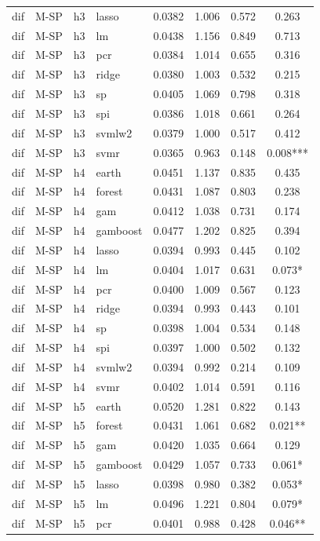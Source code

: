 \begin{ThreePartTable}
\begin{longtable}[t]{llclcccc}
dif & M-SP & h3 & lasso & 0.0382 & 1.006 & 0.572 & 0.263\\
dif & M-SP & h3 & lm & 0.0438 & 1.156 & 0.849 & 0.713\\
dif & M-SP & h3 & pcr & 0.0384 & 1.014 & 0.655 & 0.316\\
dif & M-SP & h3 & ridge & 0.0380 & 1.003 & 0.532 & 0.215\\
dif & M-SP & h3 & sp & 0.0405 & 1.069 & 0.798 & 0.318\\
dif & M-SP & h3 & spi & 0.0386 & 1.018 & 0.661 & 0.264\\
dif & M-SP & h3 & svmlw2 & 0.0379 & 1.000 & 0.517 & 0.412\\
dif & M-SP & h3 & svmr & 0.0365 & 0.963 & 0.148 & 0.008***\\
\addlinespace
dif & M-SP & h4 & earth & 0.0451 & 1.137 & 0.835 & 0.435\\
dif & M-SP & h4 & forest & 0.0431 & 1.087 & 0.803 & 0.238\\
dif & M-SP & h4 & gam & 0.0412 & 1.038 & 0.731 & 0.174\\
dif & M-SP & h4 & gamboost & 0.0477 & 1.202 & 0.825 & 0.394\\
dif & M-SP & h4 & lasso & 0.0394 & 0.993 & 0.445 & 0.102\\
dif & M-SP & h4 & lm & 0.0404 & 1.017 & 0.631 & 0.073*\\
dif & M-SP & h4 & pcr & 0.0400 & 1.009 & 0.567 & 0.123\\
dif & M-SP & h4 & ridge & 0.0394 & 0.993 & 0.443 & 0.101\\
dif & M-SP & h4 & sp & 0.0398 & 1.004 & 0.534 & 0.148\\
dif & M-SP & h4 & spi & 0.0397 & 1.000 & 0.502 & 0.132\\
dif & M-SP & h4 & svmlw2 & 0.0394 & 0.992 & 0.214 & 0.109\\
dif & M-SP & h4 & svmr & 0.0402 & 1.014 & 0.591 & 0.116\\
\addlinespace
dif & M-SP & h5 & earth & 0.0520 & 1.281 & 0.822 & 0.143\\
dif & M-SP & h5 & forest & 0.0431 & 1.061 & 0.682 & 0.021**\\
dif & M-SP & h5 & gam & 0.0420 & 1.035 & 0.664 & 0.129\\
dif & M-SP & h5 & gamboost & 0.0429 & 1.057 & 0.733 & 0.061*\\
dif & M-SP & h5 & lasso & 0.0398 & 0.980 & 0.382 & 0.053*\\
dif & M-SP & h5 & lm & 0.0496 & 1.221 & 0.804 & 0.079*\\
dif & M-SP & h5 & pcr & 0.0401 & 0.988 & 0.428 & 0.046**\\

\end{longtable}
\end{ThreePartTable}
